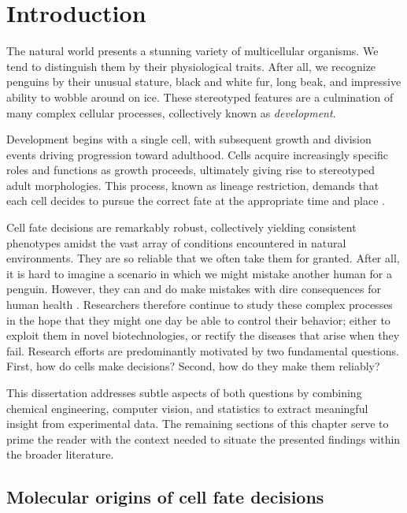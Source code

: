 \chapter{Introduction}
\label{ch:intro}

The natural world presents a stunning variety of multicellular organisms. We tend to distinguish them by their physiological traits. After all, we recognize penguins by their unusual stature, black and white fur, long beak, and impressive ability to wobble around on ice. These stereotyped features are a culmination of many complex cellular processes, collectively known as \emph{development}.

Development begins with a single cell, with subsequent growth and division events driving progression toward adulthood. Cells acquire increasingly specific roles and functions as growth proceeds, ultimately giving rise to stereotyped adult morphologies. This process, known as lineage restriction, demands that each cell decides to pursue the correct fate at the appropriate time and place \cite{Wilkins1993}.

Cell fate decisions are remarkably robust, collectively yielding consistent phenotypes amidst the vast array of conditions encountered in natural environments. They are so reliable that we often take them for granted. After all, it is hard to imagine a scenario in which we might mistake another human for a penguin. However, they can and do make mistakes with dire consequences for human health \cite{Immuno2010,Wang2009,Hornberg2006}. Researchers therefore continue to study these complex processes in the hope that they might one day be able to control their behavior; either to exploit them in novel biotechnologies, or rectify the diseases that arise when they fail. Research efforts are predominantly motivated by two fundamental questions. First, how do cells make decisions? Second, how do they make them reliably? 

This dissertation addresses subtle aspects of both questions by combining chemical engineering, computer vision, and statistics to extract meaningful insight from experimental data. The remaining sections of this chapter serve to prime the reader with the context needed to situate the presented findings within the broader literature. 

\section{Molecular origins of cell fate decisions}

